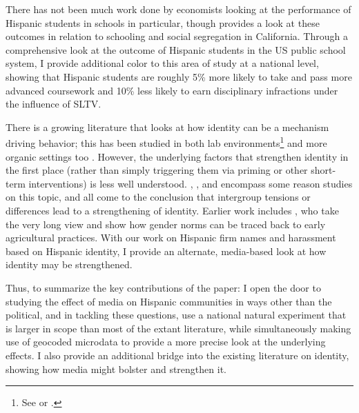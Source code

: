 \documentclass[11pt]{article}
\begin{document}
There has not been much work done by economists looking at the performance of Hispanic students in schools in particular, though \cite{cascio_cracks_2012} provides a look at these outcomes in relation to schooling and social segregation in California. Through a comprehensive look at the outcome of Hispanic students in the US public school system, I provide additional color to this area of study at a national level, showing that Hispanic students are roughly 5\% more likely to take and pass more advanced coursework and 10\% less likely to earn disciplinary infractions under the influence of SLTV.

There is a growing literature that looks at how identity can be a mechanism driving behavior; this has been studied in both lab environments\footnote{ See \cite{benjamin_social_2007} or \cite{benjamin_religious_2010}.} and more organic settings too \citep{bursztyn_moral_2015}. However, the underlying factors that strengthen identity in the first place (rather than simply triggering them via priming or other short-term interventions) is less well understood.  \cite{bisin_bend_2010}, \cite{atkin_how_2019}, and \cite{bazzi_unity_2019} encompass some reason studies on this topic, and all come to the conclusion that intergroup tensions or differences lead to a strengthening of identity. Earlier work includes \cite{@CITE ALESINA}, who take the very long view and show how gender norms can be traced back to early agricultural practices. With our work on Hispanic firm names and harassment based on Hispanic identity, I provide an alternate, media-based look at how identity may be strengthened. 

Thus, to summarize the key contributions of the paper: I open the door to studying the effect of media on Hispanic communities in ways other than the political, and in tackling these questions, use a national natural experiment that is larger in scope than most of the extant literature, while simultaneously making use of geocoded microdata to provide a more precise look at the underlying effects. I also provide an additional bridge into the existing literature on identity, showing how media might bolster and strengthen it.


\end{document}
